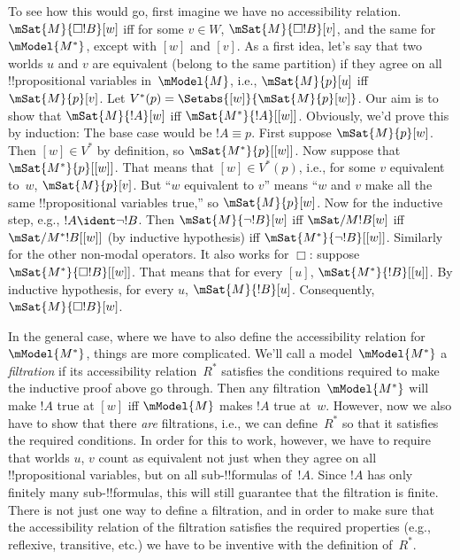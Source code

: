 \documentclass[../../../include/open-logic-section]{subfiles}
\begin{document}
To see how this would go, first imagine we have no accessibility
relation. $\mSat{M}{\Box !B}[w]$ iff for some $v \in W$,
$\mSat{M}{\Box !B}[v]$, and the same for $\mModel{M^*}$, except with
$[w]$ and $[v]$. As a first idea, let's say that two worlds $u$ and
$v$ are equivalent (belong to the same partition) if they agree on all
!!{propositional variable}s in~$\mModel{M}$, i.e., $\mSat{M}{p}[u]$
iff $\mSat{M}{p}[v]$. Let $V^*(p) = \Setabs{[w]}{\mSat{M}{p}[w]}$.
Our aim is to show that $\mSat{M}{!A}[w]$ iff
$\mSat{M^*}{!A}[{[w]}]$. Obviously, we'd prove this by induction: The
base case would be $!A \equiv p$. First suppose $\mSat{M}{p}[w]$. Then
$[w] \in V^*$ by definition, so $\mSat{M^*}{p}[{[w]}]$. Now suppose
that $\mSat{M^*}{p}[{[w]}]$. That means that $[w] \in V^*(p)$, i.e.,
for some $v$ equivalent to~$w$, $\mSat{M}{p}[v]$. But ``$w$ equivalent
to $v$'' means ``$w$ and $v$ make all the same !!{propositional variable}s
true,'' so $\mSat{M}{p}[w]$. Now for the inductive step, e.g., $!A
\ident \lnot !B$. Then $\mSat{M}{\lnot !B}[w]$ iff $\mSat/{M}{!B}[w]$
iff $\mSat/{M^*}{!B}[{[w]}]$ (by inductive hypothesis) iff
$\mSat{M^*}{\lnot !B}[{[w]}]$. Similarly for the other non-modal
operators. It also works for $\Box$: suppose $\mSat{M^*}{\Box
  !B}[{[w]}]$. That means that for every $[u]$,
$\mSat{M^*}{!B}[{[u]}]$. By inductive hypothesis, for every $u$,
$\mSat{M}{!B}[u]$. Consequently, $\mSat{M}{\Box !B}[w]$.

In the general case, where we have to also define the accessibility
relation for $\mModel{M^*}$, things are more complicated. We'll call a
model~$\mModel{M^*}$ a \emph{filtration} if its accessibility
relation~$R^*$ satisfies the conditions required to make the inductive
proof above go through. Then any filtration~$\mModel{M^*}$ will make
$!A$ true at $[w]$ iff $\mModel{M}$ makes $!A$ true at~$w$. However,
now we also have to show that there \emph{are} filtrations, i.e., we
can define~$R^*$ so that it satisfies the required conditions. In
order for this to work, however, we have to require that worlds $u$,
$v$ count as equivalent not just when they agree on all
!!{propositional variable}s, but on all sub-!!{formula}s
of~$!A$. Since $!A$ has only finitely many sub-!!{formula}s, this will
still guarantee that the filtration is finite. There is not just one
way to define a filtration, and in order to make sure that the
accessibility relation of the filtration satisfies the required
properties (e.g., reflexive, transitive, etc.) we have to be inventive
with the definition of~$R^*$.
\end{document}

